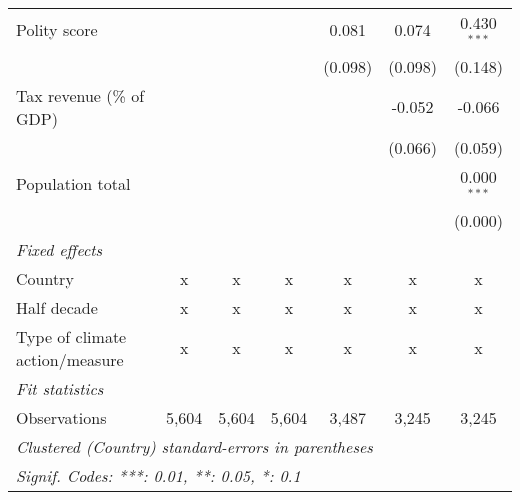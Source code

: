 \begin{tabular}{lcccccc}
   Polity score                                                 &             &             &               & 0.081         & 0.074         & 0.430$^{***}$\\   
                                                                &             &             &               & (0.098)       & (0.098)       & (0.148)\\   
   Tax revenue (\% of GDP)                                      &             &             &               &               & -0.052        & -0.066\\   
                                                                &             &             &               &               & (0.066)       & (0.059)\\   
   Population total                                             &             &             &               &               &               & 0.000$^{***}$\\   
                                                                &             &             &               &               &               & (0.000)\\   
   \emph{Fixed effects}\\
   Country                                                      & x           & x           & x             & x             & x             & x\\  
   Half decade                                                  & x           & x           & x             & x             & x             & x\\  
   Type of climate action/measure                               & x           & x           & x             & x             & x             & x\\  
   \midrule \emph{Fit statistics}\\
   Observations                                                 & 5,604       & 5,604       & 5,604         & 3,487         & 3,245         & 3,245\\  
   \midrule
   \multicolumn{7}{l}{\emph{Clustered (Country) standard-errors in parentheses}}\\
   \multicolumn{7}{l}{\emph{Signif. Codes: ***: 0.01, **: 0.05, *: 0.1}}\\
\end{tabular}
\par\endgroup



